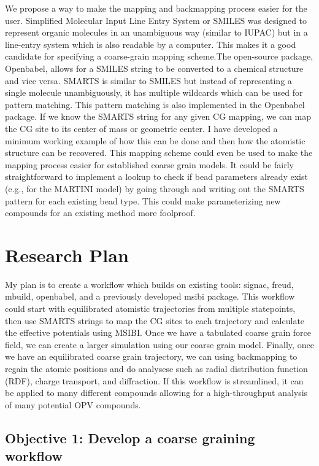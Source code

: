 We propose a way to make the mapping and backmapping process easier for the user.
Simplified Molecular Input Line Entry System or SMILES was designed to represent organic molecules in an unambiguous way (similar to IUPAC) but in a line-entry system which is also readable by a computer\cite{Weininger1988}.
This makes it a good candidate for specifying a coarse-grain mapping scheme.The open-source package, Openbabel, allows for a SMILES string to be converted to a chemical structure and vice versa.
SMARTS is similar to SMILES but instead of representing a single molecule unambiguously, it has multiple wildcards which can be used for pattern matching.%
This pattern matching is also implemented in the Openbabel package.
If we know the SMARTS string for any given CG mapping, we can map the CG site to its center of mass or geometric center.
I have developed a minimum working example of how this can be done and then how the atomistic structure can be recovered.%
This mapping scheme could even be used to make the mapping process easier for established coarse grain models.
It could be fairly straightforward to implement a lookup to check if bead parameters already exist (e.g., for the MARTINI model) by going through and writing out the SMARTS pattern for each existing bead type.
This could make parameterizing new compounds for an existing method more foolproof.

\section*{Research Plan}

My plan is to create a workflow which builds on existing tools: signac, freud, mbuild, openbabel, and a previously developed msibi package.
This workflow could start with equilibrated atomistic trajectories from multiple statepoints, then use SMARTS strings to map the CG sites to each trajectory and calculate the effective potentials using MSIBI.
Once we have a tabulated coarse grain force field, we can create a larger simulation using our coarse grain model.
Finally, once we have an equilibrated coarse grain trajectory, we can using backmapping to regain the atomic positions and do analysese such as radial distribution function (RDF), charge transport, and diffraction.
If this workflow is streamlined, it can be applied to many different compounds allowing for a high-throughput analysis of many potential OPV compounds.

\subsection*{Objective 1: Develop a coarse graining workflow}

